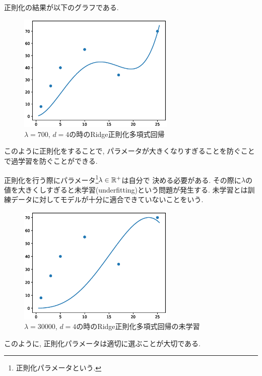 正則化の結果が以下のグラフである.
\begin{figure}[H]
    \centering
    \includegraphics[width = 7.5cm]{Images/regulared_PR.eps}
    \caption{$\lambda = 700$, $d = 4$の時のRidge正則化多項式回帰}
\end{figure}
このように正則化をすることで, パラメータが大きくなりすぎることを防ぐことで過学習を防ぐことができる.
\begin{Rem}[未学習について]
    正則化を行う際にパラメータ\footnote{正則化パラメータという.}$\lambda\in\mathbb{R}^+$は自分で
    決める必要がある. その際に$\lambda$の値を大きくしすぎると未学習(underfitting)という問題が発生する.
    未学習とは訓練データに対してモデルが十分に適合できていないことをいう.
    \begin{figure}[H]
        \centering
        \includegraphics[width=7.5cm]{Images/underfitting_PR.eps}
        \caption{$\lambda = 30000$, $d = 4$の時のRidge正則化多項式回帰の未学習}
    \end{figure}
    このように, 正則化パラメータは適切に選ぶことが大切である. 
\end{Rem}
